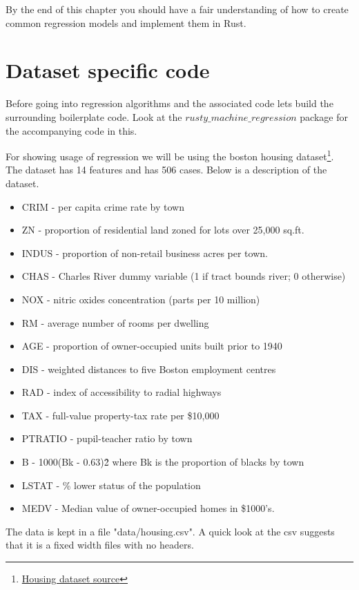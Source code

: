 \documentclass{book}
\begin{document}
By the end of this chapter you should have a fair understanding of how to create common regression models and implement them in Rust.

\label{sec:supervised_learning}

\section{Dataset specific code}%
Before going into regression algorithms and the associated code lets build the surrounding boilerplate code. Look at the $rusty\_machine\_regression$ package for the accompanying code in this.

For showing usage of regression we will be using the boston housing dataset\footnote{\href{https://www.cs.toronto.edu/~delve/data/boston/bostonDetail.html}{Housing dataset source}}. The dataset has 14 features and has 506 cases. Below is a description of the dataset.

\begin{itemize}
	\item CRIM - per capita crime rate by town
	\item ZN - proportion of residential land zoned for lots over 25,000 sq.ft.
	\item INDUS - proportion of non-retail business acres per town.
	\item CHAS - Charles River dummy variable (1 if tract bounds river; 0 otherwise)
	\item NOX - nitric oxides concentration (parts per 10 million)
	\item RM - average number of rooms per dwelling
	\item AGE - proportion of owner-occupied units built prior to 1940
	\item DIS - weighted distances to five Boston employment centres
	\item RAD - index of accessibility to radial highways
	\item TAX - full-value property-tax rate per \$10,000
	\item PTRATIO - pupil-teacher ratio by town
	\item B - 1000(Bk - 0.63)\^2 where Bk is the proportion of blacks by town
	\item LSTAT - \% lower status of the population
	\item MEDV - Median value of owner-occupied homes in \$1000's.
\end{itemize}

The data is kept in a file "data/housing.csv". A quick look at the csv suggests that it is a fixed width files with no headers.
\end{document}
